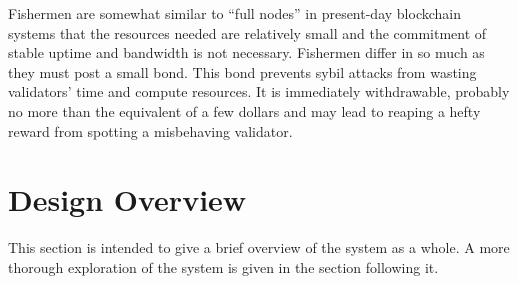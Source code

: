 \documentclass[9pt,oneside]{amsart}
\begin{document}
\begin{multicols}{2}
 Fishermen are somewhat similar to ``full nodes'' in present-day blockchain systems that the resources needed are relatively small and the commitment of stable uptime and bandwidth is not necessary. Fishermen differ in so much as they must post a small bond. This bond prevents sybil attacks from wasting validators' time and compute resources. It is immediately withdrawable, probably no more than the equivalent of a few dollars and may lead to reaping a hefty reward from spotting a misbehaving validator.


\section{Design Overview}\label{design-overview}

 This section is intended to give a brief overview of the system as a whole. A more thorough exploration of the system is given in the section following it.


\end{multicols}
\end{document}
